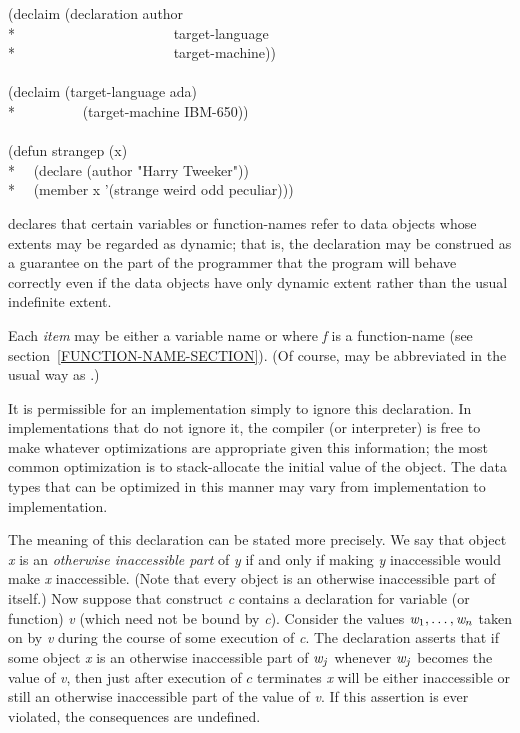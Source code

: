 \begin{flushdesc}
\begin{lisp}
(declaim (declaration author \\*
~~~~~~~~~~~~~~~~~~~~~~target-language \\*
~~~~~~~~~~~~~~~~~~~~~~target-machine)) \\
 \\
(declaim (target-language ada) \\*
~~~~~~~~~(target-machine IBM-650)) \\
 \\
(defun strangep (x) \\*
~~(declare (author "Harry Tweeker")) \\*
~~(member x '(strange weird odd peculiar)))
\end{lisp}

\item[\cdf{dynamic-extent}]

 declares that
certain variables or function-names refer to data objects whose extents may be
regarded as dynamic; that is, the declaration may be construed as a guarantee on
the part of the programmer that the program will behave correctly even if the
data objects have only dynamic extent rather than the usual indefinite extent.

Each \emph{item} may be either a variable name or 
where \emph{f} is a function-name (see section~\ref{FUNCTION-NAME-SECTION}).
(Of course,  may be abbreviated in the usual way as
.)

  It is permissible for an implementation simply to ignore this declaration.  In
implementations that do not ignore it, the compiler (or interpreter) is free to
make whatever optimizations are appropriate given this information; the most
common optimization is to stack-allocate the initial value of the object. The
data types that can be optimized in this manner may vary from implementation to
implementation.

The meaning of this declaration can be stated more precisely.  We say that
object \emph{x} is an \emph{otherwise inaccessible part} of \emph{y} if and only
if making \emph{y} inaccessible would make \emph{x} inaccessible.  (Note that
every object is an otherwise inaccessible part of itself.)  Now suppose that
construct \emph{c} contains a  declaration for variable (or
function) \emph{v} (which need not be bound by \emph{c}).  Consider the values
$\emph{w}_1, \ldots, \emph{w}_{n}$ taken on by \emph{v}
during the course of some execution of \emph{c}.  The declaration asserts that
if some object \emph{x} is an otherwise inaccessible part of
$\emph{w}_{j}$ whenever $\emph{w}_{j}$ becomes the value of \emph{v}, then just
after execution of $c$ terminates 
\emph{x} will be either inaccessible or still an otherwise inaccessible part of
the value of \emph{v}.  If this assertion is ever violated, the consequences are
undefined.


\end{flushdesc}
